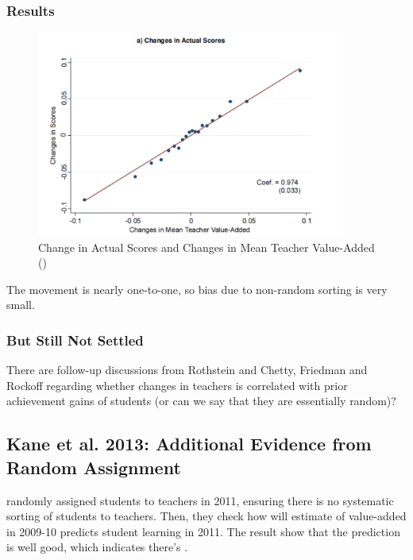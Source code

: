         \subsubsection{Results}
            \begin{figure}[H]
                \centering
                \includegraphics[width=4in]{images/ch9/9 chetty 2014.png}
                \caption{Change in Actual Scores and Changes in Mean Teacher Value-Added (\cite{chetty_measuring_2014})}
            \end{figure}
            The movement is nearly one-to-one, so bias due to non-random sorting is very small.

        \subsubsection{But Still Not Settled}
            There are follow-up discussions from Rothstein and Chetty, Friedman and Rockoff regarding whether changes in teachers is correlated with prior achievement gains of students (or can we say that they are essentially random)?
    
    \subsection{Kane et al. 2013: Additional Evidence from Random Assignment}

        \cite{kane_have_2013} randomly assigned students to teachers in 2011, ensuring there is no systematic sorting of students to teachers. Then, they check how will estimate of value-added in 2009-10 predicts student learning in 2011. The result show that the prediction is well good, which indicates there's .

